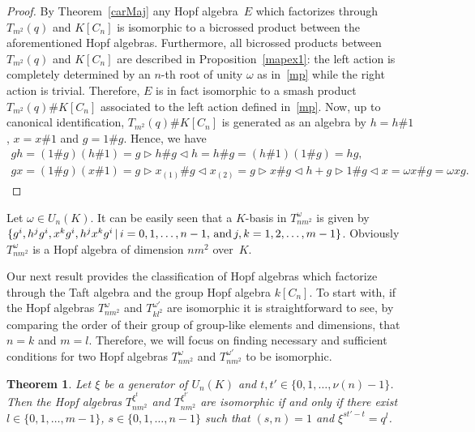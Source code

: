 \documentclass[10pt,a4paper]{amsart}
\numberwithin{equation}{section}
\newtheorem{Theorem}{Theorem}[section]
\begin{document}
\begin{proof} By Theorem~\ref{carMaj} any Hopf algebra~$E$ which factorizes through $T_{m^{2}}(q)$ and $K[C_n]$ is isomorphic to a bicrossed product
between the aforementioned Hopf algebras. Furthermore, all bicrossed products between $T_{m^{2}}(q)$ and $K[C_n]$ are described in Proposition~\ref{mapex1}: the left action is completely determined by an $n$-th root of unity $\omega$ as in~\eqref{mp} while the right action is trivial. Therefore, $E$ is in fact isomorphic to a smash product $T_{m^{2}}(q) \# K[C_n]$ associated to the left action defined in~\eqref{mp}. Now, up to canonical identification, $T_{m^{2}}(q) \# K[C_n]$ is generated as an algebra by $h = h \# 1$, $x = x \# 1$ and $g = 1\# g$. Hence, we have
\begin{gather*}
gh = (1\# g) (h \# 1)= g \triangleright h \# g \triangleleft h = h \# g = (h \# 1)(1 \# g) = hg,\\
g x = (1 \# g) (x \# 1) = g \triangleright x_{(1)}
\# g \triangleleft x_{(2)} = g \triangleright x \# g \triangleleft h + g \triangleright 1 \# g \triangleleft x =\omega x \# g = \omega x g. \tag*{\qed}
\end{gather*}\renewcommand{\qed}{}
\end{proof}
\begin{Remark}Let $\omega \in U_{n}(K)$. It can be easily seen that a $K$-basis in $T_{nm^{2}}^ {\omega}$ is given by $\{ g^{i}, h^{j} g^{i},
 x^{k} g^{i}, h^{j} x^{k} g^{i} \,| \,i = 0, 1,\dots, n-1, \,{\rm and}\, j, k = 1, 2,\dots, m-1 \}$. Obviously $T_{nm^{2}}^ {\omega}$ is a Hopf algebra of dimension $nm^{2}$ over~$K$.
\end{Remark}

Our next result provides the classification of Hopf algebras which factorize through the Taft algebra and the group Hopf algebra $k[C_{n}]$. To start with, if the Hopf algebras $T_{nm^{2}}^{\omega}$ and $T_{kl^{2}}^ {\omega '}$ are isomorphic it is straightforward to see, by comparing the order of their group of group-like elements and dimensions, that $n=k$ and $m=l$. Therefore, we will focus on finding necessary and sufficient conditions for two Hopf algebras $T_{nm^{2}}^ {\omega}$ and $T_{nm^{2}}^ {\omega '}$ to be isomorphic.


\begin{Theorem}\label{izo} Let $\xi$ be a generator of $U_n (K)$ and $t, t' \in \{ 0, 1,\dots, \nu (n) -1 \}$. Then the Hopf algebras $T_{nm^{2}}^ {\xi^{t}}$ and $T_{nm^{2}}^ {\xi^{t'}}$ are isomorphic if and only if there exist $l \in \{ 0, 1,\dots, m-1 \}$, $s \in \{ 0, 1,\dots, n-1 \}$ such that $(s, n) = 1$ and $\xi^{st' - t} = q^{l}$.
\end{Theorem}
\end{document}
